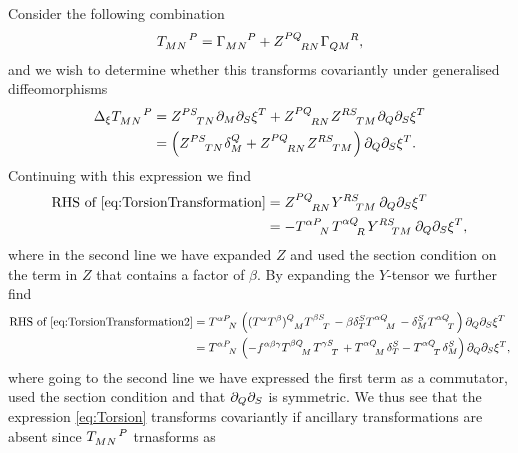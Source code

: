 Consider the following combination \cite{Cederwall:2013naa}
\begin{equation}\label{eq:Torsion}
    \tensor{T}{_{MN}^P} = \tensor{\Gamma}{_{MN}^P}+\tensor{Z}{^{PQ}_{RN}}\tensor{\Gamma}{_{QM}^R},
\end{equation}
and we wish to determine whether this transforms covariantly under generalised diffeomorphisms
\begin{equation}\label{eq:TorsionTransformation}
    \begin{aligned}
        \Delta_\xi\tensor{T}{_M_N^P} &= \tensor{Z}{^{PS}_{TN}}\pd_M\pd_S\xi^T+\tensor{Z}{^{PQ}_{RN}}\tensor{Z}{^{RS}_{TM}}\pd_Q\pd_S\xi^T\\
        &=\left(\tensor{Z}{^{PS}_{TN}}\delta_M^Q+\tensor{Z}{^{PQ}_{RN}}\tensor{Z}{^{RS}_{TM}}\right)\pd_Q\pd_S\xi^T.
    \end{aligned}
\end{equation}
Continuing with this expression we find 
\begin{equation}\label{eq:TorsionTransformation2}
    \begin{aligned}
    \text{RHS of } \eqref{eq:TorsionTransformation} &= \tensor{Z}{^{PQ}_{RN}}\tensor{Y}{^{RS}_{TM}}\pd_Q\pd_S\xi^T\\
    & =  -\tensor{T}{^\alpha^P_N}\tensor{T}{^{\alpha Q}_R}\tensor{Y}{^{RS}_{TM}}\pd_Q\pd_S\xi^T,
    \end{aligned}
\end{equation}
where in the second line we have expanded $Z$ and used the section condition on the term in $Z$ that contains a factor of $\beta$. By expanding the $Y$-tensor we further find 
\begin{equation}
    \begin{aligned}
        \text{RHS of } \eqref{eq:TorsionTransformation2} &= \tensor{T}{^{\alpha P}_N}\left((T^\alpha T^\beta)\tensor{}{^Q_M}\tensor{T}{^\beta ^S_T}-\beta\delta^S_T\tensor{T}{^{\alpha Q}_M}-\delta^S_M\tensor{T}{^{\alpha Q}_T}\right)\pd_Q\pd_S\xi^T\\
        &= \tensor{T}{^{\alpha P}_N}\left(-f^{\alpha\beta\gamma}\tensor{T}{^{\beta Q}_M}\tensor{T}{^{\gamma S}_T}+\tensor{T}{^{\alpha Q}_M}\delta^S_T-\tensor{T}{^{\alpha Q}_T}\delta^S_M\right)\pd_Q\pd_S\xi^T,\\
    \end{aligned}
\end{equation}
where going to the second line we have expressed the first term as a commutator, used the section condition and that $\partial_{Q}\partial_S$ is symmetric. We thus see that the expression \eqref{eq:Torsion} transforms covariantly if ancillary transformations are absent since $\tensor{T}{_{MN}^P}$ trnasforms as
